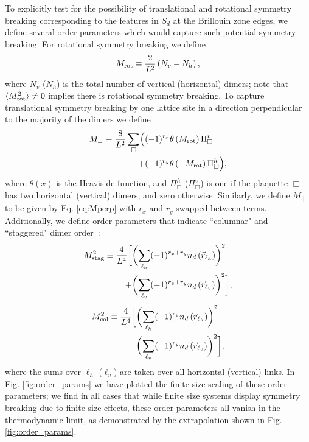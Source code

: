 \documentclass[twocolumn,prb,aps,floatfix,superscriptaddress]{revtex4-1}
\newcommand{\figref}[1]{Fig. \ref{#1}}
\newcommand{\exval}[1]{\langle #1 \rangle}
\newcommand{\Eqref}[1]{Eq. \eqref{#1}}
\newcommand{\Mrot}{M_{\rm{rot}}}
\newcommand{\Mperp}{M_\perp}
\newcommand{\Mpar}{M_{\vert\vert}}
\newcommand{\MstagSq}{M_{\rm{stag}}^2}
\newcommand{\McolSq}{M_{\rm{col}}^2}
\begin{document}
To explicitly test for the possibility of translational and rotational symmetry breaking corresponding to the features in $S_d$ at the Brillouin zone edges, we define several order parameters which would capture such potential symmetry breaking. For rotational symmetry breaking we define~\cite{Syljuasen2005} 
\begin{equation}
\Mrot \equiv  \frac{2}{L^2} \left(N_v - N_h\right) \label{eq:Mrot},
\end{equation}
where $N_v$ ($N_h$) is the total number of vertical (horizontal) dimers; note that $\exval{M_{\rm{rot}}^2 } \neq 0$ implies there is rotational symmetry breaking. To capture translational symmetry breaking by one lattice site in a direction perpendicular to the majority of the dimers we define~\cite{Syljuasen2005}
\begin{align}
\Mperp \equiv  \frac{8}{L^2} \sum_{\Box} \Bigl(  &(-1)^{r_x} \theta\left(\Mrot \right) \Pi_\Box^v \notag\\
+ &(-1)^{r_y}\theta\left(-\Mrot \right) \Pi_\Box^h\Bigr) \label{eq:Mperp},
\end{align}
where $\theta(x)$ is the Heaviside function, and $\Pi_\Box^h$ ($\Pi_\Box^v$) is one if the plaquette $\Box$ has two horizontal (vertical) dimers, and zero otherwise. Similarly, we define $\Mpar$ to be given by \Eqref{eq:Mperp} with $r_x$ and $r_y$ swapped between terms. Additionally, we define order parameters that indicate ``columnar" and ``staggered" dimer order~\cite{Syljuasen2005}:
\begin{align}
\MstagSq \equiv  \frac{4}{L^4} \biggl[ &\biggl( \sum_{\ell_h} (-1)^{r_x+r_y} n_d \left(\vec{r}_{\ell_h}\right) \biggr)^2  \notag\\
+&\biggl( \sum_{\ell_v} (-1)^{r_x+r_y} n_d \left(\vec{r}_{\ell_v}\right) \biggr)^2\biggr]\label{eq:Mstag},
\end{align}
\begin{align}
\McolSq \equiv  \frac{4}{L^4} \biggl[  &\biggl( \sum_{\ell_h} (-1)^{r_x} n_d \left(\vec{r}_{\ell_h}\right) \biggr)^2 \notag \\
+ &\biggl( \sum_{\ell_v} (-1)^{r_y} n_d \left(\vec{r}_{\ell_v}\right) \biggr)^2  \biggr]\label{eq:Mcol},
\end{align}
where the sums over $\ell_h$ ($\ell_v$) are taken over all horizontal (vertical) links. In \figref{fig:order_params} we have plotted the finite-size scaling of these order parameters; we find in all cases that while finite size systems display symmetry breaking due to finite-size effects, these order parameters all vanish in the thermodynamic limit, as demonstrated by the extrapolation shown in \figref{fig:order_params}.
\end{document}
